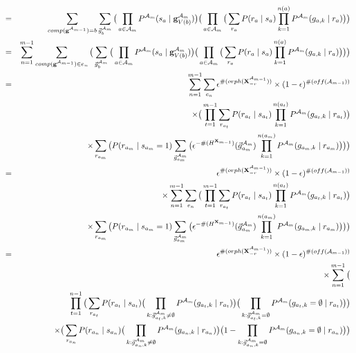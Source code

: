 \documentclass[11pt]{article}
\newcommand{\A}{{\cal A}}
\newcommand{\X}{\mathbf{X}}
\newcommand{\XrmPrev}{\X^{\A_{m-1}}_{-r}}
\newcommand{\Am}{\A_{m}}
\newcommand{\gcompPrev}{comp(\mathbf{g}^{\A_{m-1}})}
\begin{document}
\begin{eqnarray}
&=&\sum_{\gcompPrev = b} \sum_{\vec{g}^{\Am}_{b}} \big( \prod_{a \in {\Am}} P^{\Am}(s_a \mid \mathbf{g}^{\Am}_{V({b})}) \big ) \big( \prod_{a \in {\A_{m}}} \big( \sum_{r_a} P(r_a \mid s_a) \prod_{k=1}^{n(a)} P^{\Am}(g_{a,k} \mid r_a) \big) \big) \\
%
&=& \sum_{n=1}^{m-1} \sum_{\gcompPrev \in e_{n}} \big(  \sum_{\vec{g}^{\Am}_{b}} \big( \prod_{a \in {\Am}} P^{\Am}(s_a \mid \mathbf{g}^{\Am}_{V({b})}) \big ) \big( \prod_{a \in {\A_{m}}} \big( \sum_{r_a} P(r_a \mid s_a) \prod_{k=1}^{n(a)} P^{\Am}(g_{a,k} \mid r_a) \big) \big) \big)  \label{eqn.temp1} \\
%
&=& \sum_{n=1}^{m-1} \sum_{e_{n}} \epsilon^{\#(orph(\XrmPrev))} \times (1-\epsilon)^{\#(off(\A_{m-1}))}  \label{eqn.temp2} \\ 
& & \times \big( \prod_{t=1}^{m-1} \sum_{r_{a_t}} P(r_{a_t} \mid s_{a_t}) \prod_{k=1}^{n({a_t})} P^{\Am}(g_{{a_t},k} \mid r_{a_t}) \big)  \\
& & \times \sum_{r_{a_m}} \big(P(r_{a_m} \mid s_{a_m} = 1) \sum_{\vec{g}^{\Am}_{{a_m}}} \big( \epsilon^{-\#(H^{\X_{m-1}})}(\vec{g}^{\Am}_{a_m}) \prod_{k=1}^{n({a_m})} P^{\Am}(g_{{a_m},k} \mid r_{a_m}) \big) \big) \big) \nonumber \\
%
&=& \epsilon^{\#(orph(\XrmPrev))} \times (1-\epsilon)^{\#(off(\A_{m-1}))} \\ 
& & \times \sum_{n=1}^{m-1} \sum_{e_{n}} \big( \prod_{t=1}^{m-1} \sum_{r_{a_t}} P(r_{a_t} \mid s_{a_t}) \prod_{k=1}^{n({a_t})} P^{\Am}(g_{{a_t},k} \mid r_{a_t}) \big)  \\
& & \times \sum_{r_{a_m}} \big(P(r_{a_m} \mid s_{a_m} = 1) \sum_{\vec{g}^{\Am}_{{a_m}}} \big( \epsilon^{-\#(H^{\X_{m-1}})}(\vec{g}^{\Am}_{a_m}) \prod_{k=1}^{n({a_m})} P^{\Am}(g_{{a_m},k} \mid r_{a_m}) \big) \big) \big) \nonumber \\
%
&=& \epsilon^{\#(orph(\XrmPrev))} \times (1-\epsilon)^{\#(off(\A_{m-1}))} \label{topdownfinal} \\ 
& & \times \sum_{n=1}^{m-1} \big( \nonumber \\
& & \qquad \prod_{t=1}^{n-1} \big( \sum_{r_{a_t}} P(r_{a_t} \mid s_{a_t}) \big( \prod_{k : \vec{g}^{\Am}_{a_t,k} \neq \emptyset} P^{\Am}(g_{{a_t},k} \mid r_{a_t}) \big) \big( \prod_{k : \vec{g}^{\Am}_{a_t,k} = \emptyset} P^{\Am}(g_{{a_t},k} = \emptyset \mid r_{a_t}) \big) \big) \nonumber \\
& & \qquad \times \big( \sum_{r_{a_n}} P(r_{a_n} \mid s_{a_n}) \big( \prod_{k : \vec{g}^{\Am}_{a_n,k} \neq \emptyset} P^{\Am}(g_{{a_n},k} \mid r_{a_n}) \big) \big( 1 - \prod_{k : \vec{g}^{\Am}_{a_n,k} = \emptyset} P^{\Am}(g_{{a_n},k} = \emptyset \mid r_{a_n}) \big) \big) \nonumber \\

\end{eqnarray}
\end{document}
